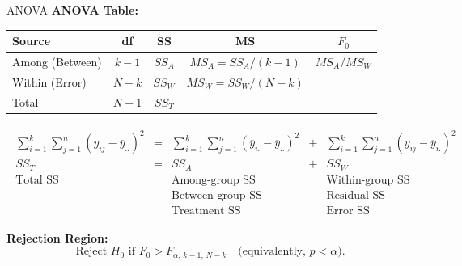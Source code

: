 \documentclass[aspectratio=169]{beamer}
\begin{document}
\begin{frame}{ANOVA}
\textbf{ANOVA Table:}
\begin{center}
\small
\begin{tabular}{lcccc}
\hline
Source & df & SS & MS & $F_0$ \\
\hline
Among (Between) & $k-1$  & $SS_A$ & $MS_A = SS_A/(k-1)$ & $MS_A / MS_W$ \\
Within (Error)  & $N-k$  & $SS_W$ & $MS_W = SS_W/(N-k)$ &                \\
Total           & $N-1$  & $SS_T$ &                     &                \\
\hline
\end{tabular}
\end{center}
\vspace{8pt}
\begin{gather*}
\begin{array}{ccccc}
\displaystyle \sum_{i=1}^k \sum_{j=1}^{n}(y_{ij} - \overline{y}_{..})^2		& = &
\displaystyle \sum_{i=1}^k \sum_{j=1}^{n}(\overline{y}_{i.}-\overline{y}_{..})^2 	& + &
\displaystyle \sum_{i=1}^k \sum_{j=1}^{n}(y_{ij}-\overline{y}_{i.})^2		\\[20pt]
%
SS_T & = & SS_A & + & SS_W \\[5pt]
%
\mbox{Total SS}	& & \mbox{Among-group SS}& & \mbox{Within-group SS} \\
& & \mbox{Between-group SS}& & \mbox{Residual SS} \\
& & \mbox{Treatment SS}& & \mbox{Error SS} 
\end{array}
\end{gather*}


\textbf{Rejection Region:}
\[
\text{Reject } H_0 \text{ if } F_0 > F_{\alpha,\, k-1,\, N-k}
\quad \text{(equivalently, } p < \alpha \text{).}
\]
\end{frame}
\end{document}
